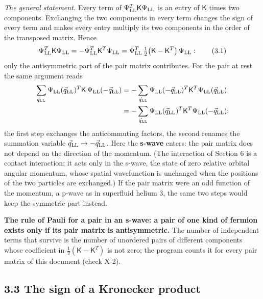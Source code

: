 \documentclass[
  10pt,
]{article}
\begin{document}
\emph{The general statement.} Every term of
\(\Psi^T_{\rm LL}\mathsf K\Psi_{\rm LL}\) is an entry of \(\mathsf K\)
times two components. Exchanging the two components in every term
changes the sign of every term and makes every entry multiply its two
components in the order of the transposed matrix. Hence
\[\Psi^T_{\rm LL}\mathsf K\Psi_{\rm LL}=-\Psi^T_{\rm LL}\mathsf K^T\Psi_{\rm LL}=\Psi^T_{\rm LL}\,\tfrac12\big(\mathsf K-\mathsf K^T\big)\,\Psi_{\rm LL}: \tag{3.1}\]
only the antisymmetric part of the pair matrix contributes. For the pair
at rest the same argument reads
\[\begin{aligned}\sum_{\vec q_{\rm LL}}\Psi_{\rm LL}(\vec q_{\rm LL})^T\mathsf K\,\Psi_{\rm LL}(-\vec q_{\rm LL})&=-\sum_{\vec q_{\rm LL}}\Psi_{\rm LL}(-\vec q_{\rm LL})^T\mathsf K^T\Psi_{\rm LL}(\vec q_{\rm LL})\\&=-\sum_{\vec q_{\rm LL}}\Psi_{\rm LL}(\vec q_{\rm LL})^T\mathsf K^T\Psi_{\rm LL}(-\vec q_{\rm LL});\end{aligned}\]
the first step exchanges the anticommuting factors, the second renames
the summation variable \(\vec q_{\rm LL}\to-\vec q_{\rm LL}\). Here the
\textbf{s-wave} enters: the pair matrix does not depend on the direction
of the momentum. (The interaction of Section 6 is a contact interaction;
it acts only in the s-wave, the state of zero relative orbital angular
momentum, whose spatial wavefunction is unchanged when the positions of
the two particles are exchanged.) If the pair matrix were an odd
function of the momentum, a p-wave as in superfluid helium 3, the same
two steps would keep the symmetric part instead.

\textbf{The rule of Pauli for a pair in an s-wave: a pair of one kind of
fermion exists only if its pair matrix is antisymmetric.} The number of
independent terms that survive is the number of unordered pairs of
different components whose coefficient in
\(\tfrac12(\mathsf K-\mathsf K^T)\) is not zero; the program counts it
for every pair matrix of this document (check X-2).

\hypertarget{the-sign-of-a-kronecker-product}{%
\subsection{3.3 The sign of a Kronecker
product}\label{the-sign-of-a-kronecker-product}}
\end{document}
